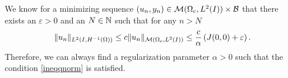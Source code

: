\begin{remark}\label{alphaconstraint}
 We know for a minimizing sequence $(u_n, y_n)\in \mathcal{M}(\Omega_c, L^{2}(I))\times \mathcal B$ that there exists an $\varepsilon > 0$ and an $N \in \mathbb{N} $ such that for any $n > N$
 \[
\lVert u_n\rVert_{L^2(I,H^{-1}(\Omega))} \leq c\lVert u_n\rVert_{\mathcal{M}(\Omega_c, L^{2}(I))} \leq \frac{c}{\alpha}\left(J(0,0) + \varepsilon \right).
 \]
 Therefore, we can always find a regularization parameter $\alpha>0$ such that the condition \eqref{ineqqnorm} is satisfied.
\end{remark}

